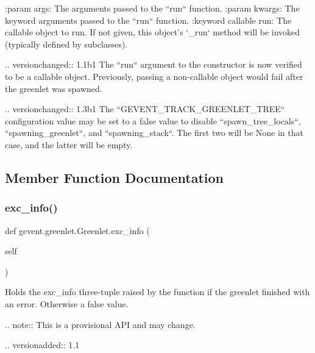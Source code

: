\begin{DoxyVerb}:param args: The arguments passed to the ``run`` function.
:param kwargs: The keyword arguments passed to the ``run`` function.
:keyword callable run: The callable object to run. If not given, this object's
    `_run` method will be invoked (typically defined by subclasses).

.. versionchanged:: 1.1b1
    The ``run`` argument to the constructor is now verified to be a callable
    object. Previously, passing a non-callable object would fail after the greenlet
    was spawned.

.. versionchanged:: 1.3b1
   The ``GEVENT_TRACK_GREENLET_TREE`` configuration value may be set to
   a false value to disable ``spawn_tree_locals``, ``spawning_greenlet``,
   and ``spawning_stack``. The first two will be None in that case, and the
   latter will be empty.
\end{DoxyVerb}
 

\subsection{Member Function Documentation}
\mbox{\label{classgevent_1_1greenlet_1_1_greenlet_a682549e4c5f1de1c4d59ca5317794e39}} 
\subsubsection{\texorpdfstring{exc\+\_\+info()}{exc\_info()}}
{\footnotesize\ttfamily def gevent.\+greenlet.\+Greenlet.\+exc\+\_\+info (\begin{DoxyParamCaption}\item[{}]{self }\end{DoxyParamCaption})}

\begin{DoxyVerb}Holds the exc_info three-tuple raised by the function if the
greenlet finished with an error. Otherwise a false value.

.. note:: This is a provisional API and may change.

.. versionadded:: 1.1
\end{DoxyVerb}
 \mbox{\label{classgevent_1_1greenlet_1_1_greenlet_a0f4b578b1eeb79d65f90a9bae439ea82}} 
